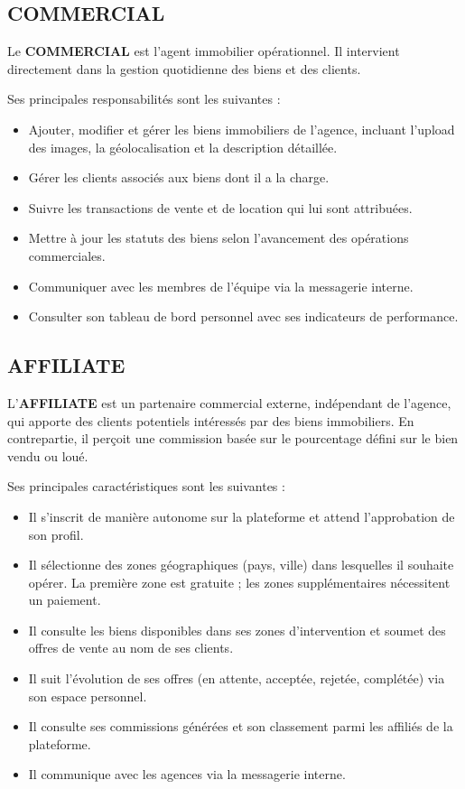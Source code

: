 \documentclass[a4paper,12pt]{report}
\begin{document}
\subsection{COMMERCIAL}

Le \textbf{COMMERCIAL} est l'agent immobilier opérationnel. Il intervient directement dans la gestion quotidienne des biens et des clients.

Ses principales responsabilités sont les suivantes :

\begin{itemize}
    \item Ajouter, modifier et gérer les biens immobiliers de l'agence, incluant l'upload des images, la géolocalisation et la description détaillée.
    \item Gérer les clients associés aux biens dont il a la charge.
    \item Suivre les transactions de vente et de location qui lui sont attribuées.
    \item Mettre à jour les statuts des biens selon l'avancement des opérations commerciales.
    \item Communiquer avec les membres de l'équipe via la messagerie interne.
    \item Consulter son tableau de bord personnel avec ses indicateurs de performance.
\end{itemize}

\subsection{AFFILIATE}

L'\textbf{AFFILIATE} est un partenaire commercial externe, indépendant de l'agence, qui apporte des clients potentiels intéressés par des biens immobiliers. En contrepartie, il perçoit une commission basée sur le pourcentage défini sur le bien vendu ou loué.

Ses principales caractéristiques sont les suivantes :

\begin{itemize}
    \item Il s'inscrit de manière autonome sur la plateforme et attend l'approbation de son profil.
    \item Il sélectionne des zones géographiques (pays, ville) dans lesquelles il souhaite opérer. La première zone est gratuite ; les zones supplémentaires nécessitent un paiement.
    \item Il consulte les biens disponibles dans ses zones d'intervention et soumet des offres de vente au nom de ses clients.
    \item Il suit l'évolution de ses offres (en attente, acceptée, rejetée, complétée) via son espace personnel.
    \item Il consulte ses commissions générées et son classement parmi les affiliés de la plateforme.
    \item Il communique avec les agences via la messagerie interne.
\end{itemize}
\end{document}
